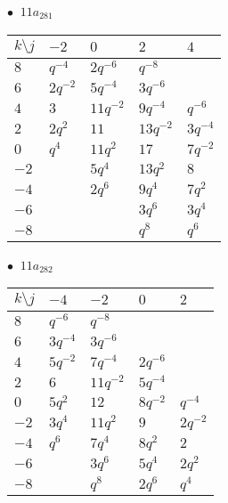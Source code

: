 \begin{minipage}{\linewidth}
$\bullet\ $ $11a_{281}$ \vspace{0.5em} \\
\begin{tabular}{l|llll}
$k \setminus j$ & $-2$ & $0$ & $2$ & $4$ \\
\hline
$8$ & $q^{-4}$ & $2q^{-6}$ & $q^{-8}$ &  \\
$6$ & $2q^{-2}$ & $5q^{-4}$ & $3q^{-6}$ &  \\
$4$ & $3$ & $11q^{-2}$ & $9q^{-4}$ & $q^{-6}$ \\
$2$ & $2q^{2}$ & $11$ & $13q^{-2}$ & $3q^{-4}$ \\
$0$ & $q^{4}$ & $11q^{2}$ & $17$ & $7q^{-2}$ \\
$-2$ &  & $5q^{4}$ & $13q^{2}$ & $8$ \\
$-4$ &  & $2q^{6}$ & $9q^{4}$ & $7q^{2}$ \\
$-6$ &  &  & $3q^{6}$ & $3q^{4}$ \\
$-8$ &  &  & $q^{8}$ & $q^{6}$ \\
\end{tabular}
\vspace{2em}
\end{minipage}
%
\begin{minipage}{\linewidth}
$\bullet\ $ $11a_{282}$ \vspace{0.5em} \\
\begin{tabular}{l|llll}
$k \setminus j$ & $-4$ & $-2$ & $0$ & $2$ \\
\hline
$8$ & $q^{-6}$ & $q^{-8}$ &  &  \\
$6$ & $3q^{-4}$ & $3q^{-6}$ &  &  \\
$4$ & $5q^{-2}$ & $7q^{-4}$ & $2q^{-6}$ &  \\
$2$ & $6$ & $11q^{-2}$ & $5q^{-4}$ &  \\
$0$ & $5q^{2}$ & $12$ & $8q^{-2}$ & $q^{-4}$ \\
$-2$ & $3q^{4}$ & $11q^{2}$ & $9$ & $2q^{-2}$ \\
$-4$ & $q^{6}$ & $7q^{4}$ & $8q^{2}$ & $2$ \\
$-6$ &  & $3q^{6}$ & $5q^{4}$ & $2q^{2}$ \\
$-8$ &  & $q^{8}$ & $2q^{6}$ & $q^{4}$ \\
\end{tabular}
\vspace{2em}
\end{minipage}
%
